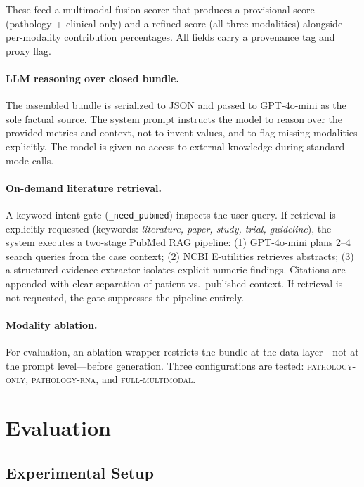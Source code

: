 \documentclass[11pt,twocolumn]{article}
\begin{document}
These feed a multimodal fusion scorer that produces a provisional score
(pathology + clinical only) and a refined score (all three modalities)
alongside per-modality contribution percentages. All fields carry a
provenance tag and proxy flag.

\paragraph{LLM reasoning over closed bundle.}
The assembled bundle is serialized to JSON and passed to GPT-4o-mini
\cite{openai2024gpt4o} as the sole factual source. The system prompt
instructs the model to reason over the provided metrics and context, not to invent values, and to flag missing modalities
explicitly. The model is given no access to external knowledge during
standard-mode calls.

\paragraph{On-demand literature retrieval.}
A keyword-intent gate (\texttt{\_need\_pubmed}) inspects the user query.
If retrieval is explicitly requested (keywords: \emph{literature, paper,
study, trial, guideline}), the system executes a two-stage PubMed RAG
pipeline: (1) GPT-4o-mini plans 2--4 search queries from the case
context; (2) NCBI E-utilities retrieves abstracts; (3) a structured
evidence extractor isolates explicit numeric findings. Citations are
appended with clear separation of patient vs.\ published context. If retrieval is not requested, the gate suppresses
the pipeline entirely.

\paragraph{Modality ablation.}
For evaluation, an ablation wrapper restricts the bundle at the
data layer—not at the prompt level—before generation. Three configurations
are tested: \textsc{pathology-only}, \textsc{pathology-rna}, and \textsc{full-multimodal}.

\section{Evaluation}

\subsection{Experimental Setup}
\end{document}
